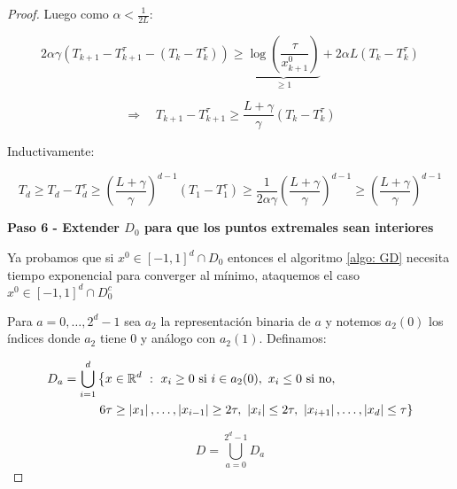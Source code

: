 \begin{proof}
	Luego como $\alpha < \frac{1}{2L}$:
	
	\begin{equation*}
	2 \alpha \gamma \left(T_{k+1} - T_{k+1}^{\tau} - \left(T_k - T_k^{\tau}\right)\right) \geq \underbrace{\log \left(\frac{\tau}{x_{k+1}^0}\right)}_{\geq 1} + 2 \alpha L\left(T_k - T_k^{\tau}\right)
	\end{equation*}
	
	\begin{equation*}
		\Rightarrow \quad T_{k+1} - T_{k+1}^{\tau} \geq \dfrac{L + \gamma}{\gamma} \left(T_k - T_k^{\tau}\right)
	\end{equation*}
	
	Inductivamente:
	
	\begin{equation}
		T_d \geq T_d - T_d^{\tau} \geq \left(\dfrac{L+\gamma}{\gamma}\right)^{d-1} \left(T_1 - T_1^{\tau}\right) \geq \dfrac{1}{2 \alpha \gamma}  \left(\dfrac{L+\gamma}{\gamma}\right)^{d-1}  \geq \left(\dfrac{L+\gamma}{\gamma}\right)^{d-1} 
	\end{equation}
	
	\medskip
	
	\textbf{Paso 6 - Extender $D_0$ para que los puntos extremales sean interiores}
	
	\medskip
	
	Ya probamos que si $x^0 \in [-1,1]^d \cap D_0$ entonces el algoritmo \ref{algo: GD} necesita tiempo exponencial para converger al m\'inimo, ataquemos el caso $x^0 \in [-1,1]^d \cap D_0^c$
	
	Para $a=0, \dots, 2^d -1$ sea $a_2$ la representaci\'on binaria de $a$ y notemos $a_2(0)$ los \'indices donde $a_2$ tiene $0$ y an\'alogo con $a_2(1)$. Definamos:
	
	\begin{equation*}
	\begin{split}
		D_a = \bigcup\limits_{i=1}^{d} & \left\lbrace x \in {\mathbb{R}}^d ~:~ x_i \geq 0 \text{ si } i \in a_2(0), \ x_i \leq 0 \text{ si no}, \right. \\
			&  \left. 6\tau \geq \left\lvert x_1\right\rvert, \dots, \left\lvert x_{i-1}\right\rvert \geq 2\tau,\ \left\lvert x_i\right\rvert \leq 2\tau,\ \left\lvert x_{i+1}\right\rvert, \dots, \left\lvert x_d\right\rvert \leq \tau \right\rbrace
	\end{split}
	\end{equation*}
	
	\begin{equation*}
		D = \bigcup\limits_{a = 0}^{2^d -1} {D_a}
	\end{equation*}
	

\end{proof}
